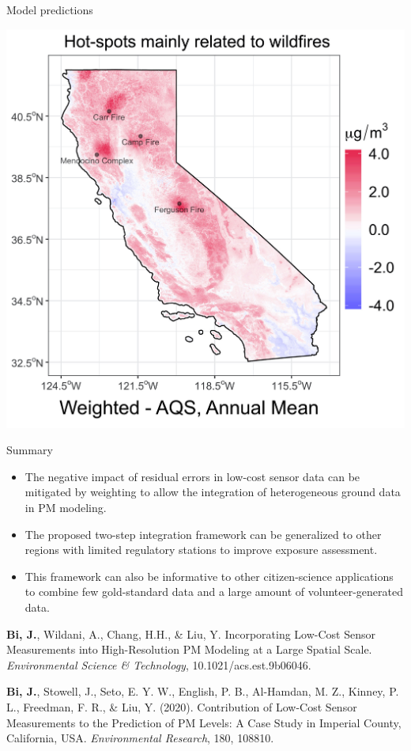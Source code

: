 \begin{frame}{Model predictions}
\begin{minipage}{0.54\textwidth}
    \includegraphics[width=\textwidth]{img/aqs_w.jpg}
\end{minipage}
\end{frame}

\begin{frame}{Summary}
    \begin{itemize}
        \item The negative impact of residual errors in low-cost sensor data can be mitigated by weighting to allow the integration of heterogeneous ground data in PM modeling.
        \item The proposed two-step integration framework can be generalized to other regions with limited regulatory stations to improve exposure assessment.
        \item This framework can also be informative to other citizen-science applications to combine few gold-standard data and a large amount of volunteer-generated data.
    \end{itemize}
    \vspace{0.2cm}
    \begin{spacing}{0.3}
    \scriptsize
    \textbf{Bi, J.}, Wildani, A., Chang, H.H., \& Liu, Y. Incorporating Low-Cost Sensor Measurements into High-Resolution PM Modeling at a Large Spatial Scale. \textit{Environmental Science \& Technology}, 10.1021/acs.est.9b06046.
    
    \vspace{0.2cm}
    
    \textbf{Bi, J.}, Stowell, J., Seto, E. Y. W., English, P. B., Al-Hamdan, M. Z., Kinney, P. L., Freedman, F. R., \& Liu, Y. (2020). Contribution of Low-Cost Sensor Measurements to the Prediction of PM Levels: A Case Study in Imperial County, California, USA. \textit{Environmental Research}, 180, 108810.

    \end{spacing}
\end{frame}